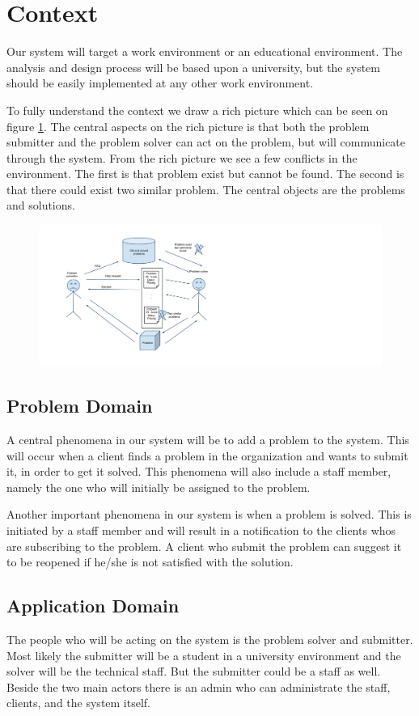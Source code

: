 \section{Context}
Our system will target a work environment or an educational environment.
The analysis and design process will be based upon a university, but the system should be easily implemented at any other work environment. 

To fully understand the context we draw a rich picture which can be seen on figure \ref{fig:rich_picture}. 
The central aspects on the rich picture is that both the problem submitter and the problem solver can act on the problem, but will communicate through the system. 
From the rich picture we see a few conflicts in the environment. 
The first is that problem exist but cannot be found.
The second is that there could exist two similar problem.
The central objects are the problems and solutions.

\begin{figure}%
\includegraphics[scale = 0.45]{input/background/rich_picture.pdf}%
%
\label{fig:rich_picture}%
\end{figure}

\subsection{Problem Domain}
A central phenomena in our system will be to add a problem to the system.
This will occur when a client finds a problem in the organization and wants to submit it, in order to get it solved.
This phenomena will also include a staff member, namely the one who will initially be assigned to the problem.

Another important phenomena in our system is when a problem is solved.
This is initiated by a staff member and will result in a notification to the clients whos are subscribing to the problem.
A client who submit the problem can suggest it to be reopened if he/she is not satisfied with the solution.

\subsection{Application Domain}
The people who will be acting on the system is the problem solver and submitter. Most likely the submitter will be a student in a university environment and the solver will be the technical staff. But the submitter could be a staff as well. Beside the two main actors there is an admin who can administrate the staff, clients, and the system itself. 